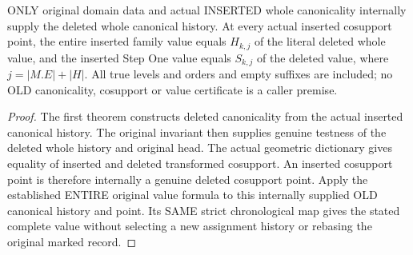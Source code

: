 \begin{theorem}
\label{hir:original-recursive-interior-empty-deletion-entire-values}
\leanok
ONLY original domain data and actual INSERTED whole canonicality internally
supply the deleted whole canonical history. At every actual inserted
cosupport point, the entire inserted family value equals $H_{k,j}$ of the
literal deleted whole value, and the inserted Step One value equals
$S_{k,j}$ of the deleted value, where $j=|M.E|+|H|$. All true levels and
orders and empty suffixes are included; no OLD canonicality, cosupport or
value certificate is a caller premise.
\end{theorem}
\begin{proof}
The first theorem constructs deleted canonicality from the actual inserted
canonical history. The original invariant then supplies genuine testness
of the deleted whole history and original head. The actual geometric
dictionary gives equality of inserted and deleted transformed cosupport.
An inserted cosupport point is therefore internally a genuine deleted
cosupport point. Apply the established ENTIRE original value formula to
this internally supplied OLD canonical history and point. Its SAME strict
chronological map gives the stated complete value without selecting a new
assignment history or rebasing the original marked record.
\end{proof}

